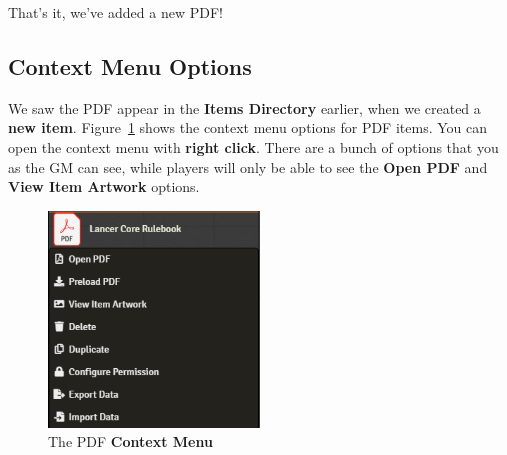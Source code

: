 \documentclass{article}
\begin{document}
    That's it, we've added a new PDF!

    \subsection{Context Menu Options}
    We saw the PDF appear in the \textbf{Items Directory} earlier, when we created a \textbf{new item}. Figure~\ref{new-item-context} shows the context menu options for PDF items. You can open the context menu with \textbf{right click}. There are a bunch of options that you as the GM can see, while players will only be able to see the \textbf{Open PDF} and \textbf{View Item Artwork} options.

    \begin{figure}[h]
        \centering
        \includegraphics[width=0.5\textwidth]{images/new-item-context.png}
        \caption{The PDF \textbf{Context Menu}}
        \label{new-item-context}
    \end{figure}
\end{document}
